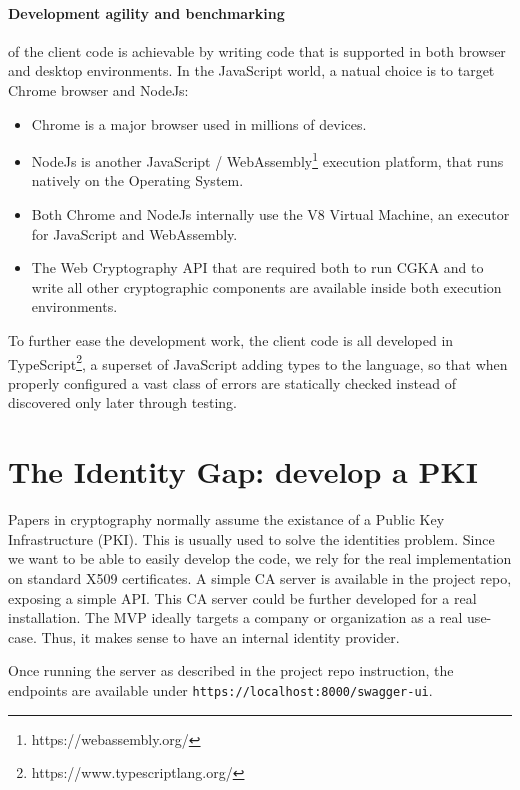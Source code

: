 \paragraph{Development agility and benchmarking} of the client code is achievable by writing code that is supported in both browser and desktop environments.
In the JavaScript world, a natual choice is to target Chrome browser and NodeJs:
\begin{itemize}
    \item Chrome is a major browser used in millions of devices.
    \item NodeJs is another JavaScript / WebAssembly\footnote{https://webassembly.org/} execution platform, that runs natively on the Operating System.
    \item Both Chrome and NodeJs internally use the V8 Virtual Machine, an executor for JavaScript and WebAssembly.
    \item The Web Cryptography API that are required both to run CGKA and to write all other cryptographic components are available inside both execution environments.
\end{itemize}

To further ease the development work, the client code is all developed in TypeScript\footnote{https://www.typescriptlang.org/}, a superset of JavaScript adding types to the language, so that when properly configured a vast class of 
errors are statically checked instead of discovered only later through testing.

\section{The Identity Gap: develop a PKI}

Papers in cryptography normally assume the existance of a Public Key Infrastructure (PKI).
This is usually used to solve the identities problem.
Since we want to be able to easily develop the code, we rely for the real implementation on standard X509 certificates.
A simple CA server is available in the project repo, exposing a simple API. This CA server could be further developed for a real installation.
The MVP ideally targets a company or organization as a real use-case. 
Thus, it makes sense to have an internal identity provider.

Once running the server as described in the project repo instruction, the endpoints are available under \texttt{https://localhost:8000/swagger-ui}.

